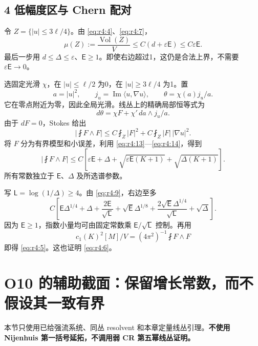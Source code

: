 \documentclass[UTF8,11pt,openany,oneside,fontset=none]{ctexbook}
\begin{document}
\subsection{4 低幅度区与 Chern 配对}\label{ch4:ux4f4eux5e45ux5ea6ux533aux4e0e-chern-ux914dux5bf9}

令 \(Z=\{|u|\le3\ell/4\}\)。由 \eqref{eq:r4:4}、\eqref{eq:r4:7}， \[
\mu(Z):=\frac{\operatorname{Vol}(Z)}V
\le C(d+\varepsilon\mathsf E)
\le C\varepsilon\mathsf E.
\tag{4.14}\label{eq:r4:14}
\] 最后一步用 \(d\le\Delta\le\varepsilon\)、\(\mathsf E\ge1\)。即使右边超过1，这仍是合法上界，不需要 \(\varepsilon\mathsf E\to0\)。

选固定光滑 \(\chi\)，在 \(|u|\le\ell/2\) 为0，在 \(|u|\ge3\ell/4\) 为1。置 \[
a=|u|^2,\qquad j_u=\operatorname{Im}\langle u,\nabla u\rangle,
\qquad\theta=\chi(a)j_u/a.
\] 它在零点附近为零，因此全局光滑。线丛上的精确局部恒等式为 \[
d\theta=\chi F+\chi'\,da\wedge j_u/a.
\tag{4.15}\label{eq:r4:15}
\] 由于 \(dF=0\)，Stokes 给出 \[
\left|\fint F\wedge F\right|
\le C\fint_Z|F|^2+C\fint_Z|F|\,|\nabla u|^2.
\tag{4.16}\label{eq:r4:16}
\] 将 \(F\) 分为有界模型和小误差，利用 \eqref{eq:r4:13}---\eqref{eq:r4:14}，得到 \[
\left|\fint F\wedge F\right|
\le C\left[
\varepsilon\mathsf E+\Delta
+\sqrt{\varepsilon\mathsf E(K+1)}
+\sqrt{\Delta(K+1)}\right].
\tag{4.17}\label{eq:r4:17}
\] 所有常数独立于 \(\mathsf E\)、\(\Delta\) 及所选谱参数。

写 \(\mathsf L=\log(1/\Delta)\ge4\)。由 \eqref{eq:r4:9}，右边至多 \[
C\left[
\mathsf E\Delta^{1/4}+\Delta
+\frac{2\mathsf E}{\sqrt{\mathsf L}}
+\sqrt{\mathsf E}\Delta^{1/8}
+\frac{2\sqrt{\mathsf E}\Delta^{1/4}}{\sqrt{\mathsf L}}
+\sqrt\Delta\right].
\] 因为 \(\mathsf E\ge1\)，指数小量均可由固定常数乘 \(\mathsf E/\sqrt{\mathsf L}\) 控制。再用 \[
c_1(K)^2[M]/V=(4\pi^2)^{-1}\fint F\wedge F
\] 即得 \eqref{eq:r4:5}。这也证明 \eqref{eq:r4:6}。

\section{O10 的辅助截面：保留增长常数，而不假设其一致有界}\label{ch4:o10-ux7684ux8f85ux52a9ux622aux9762ux4fddux7559ux589eux957fux5e38ux6570ux800cux4e0dux5047ux8bbeux5176ux4e00ux81f4ux6709ux754c}

本节只使用已给强流系统、同丛 resolvent 和本章定量线丛引理。\textbf{不使用 Nijenhuis 第一括号延拓，不调用弱 CR 第五幂线丛证明。}
\end{document}
